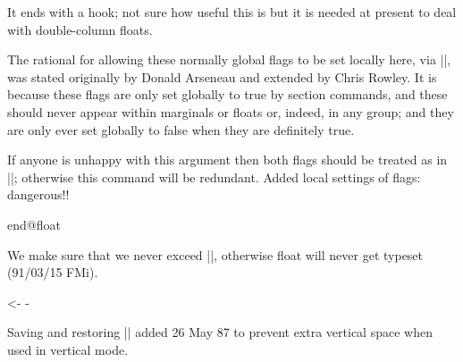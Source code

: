     It ends with a hook; not sure how useful this is but it is needed
    at present to deal with double-column floats.
    
   
    \begin{teX}
  \global \setbox\@currbox
    \color@vbox
      \normalcolor
      \vbox \bgroup
        \hsize\columnwidth
        \@parboxrestore
        \@floatboxreset
}
    \end{teX}

  
  \begin{macro}{\@floatboxreset}
    
 The rational for allowing these normally global flags to be set
 locally here, via |\@parboxrestore|, was stated originally by
 Donald Arseneau and extended by Chris Rowley.
 It is because these flags are only set globally to
 true by section commands, and these should never appear within
 marginals or floats or, indeed, in any group; and they are only ever
 set globally to false when they are definitely true.

 If anyone is unhappy with this argument then both flags should be
 treated as in |\set@nobreak|; otherwise this command will be
 redundant. 
     {Added local settings of flags: dangerous!!}
 \end{macro}
 
      
    \begin{teX}
\def \@floatboxreset {%
        \reset@font
        \normalsize
        \@setminipage
}
    \end{teX}
 
  
\begin{macro}{\@setnobreak}

    \begin{teX}
\def \@setnobreak{%
  \if@nobreak
    \let\outer@nobreak\@nobreaktrue
    \@nobreakfalse
  \fi
}
    \end{teX}
  \end{macro}

  \begin{macro}{\@setminipage}
    \begin{teX}
\def \@setminipage{%
  \@minipagetrue
  \everypar{\@minipagefalse\everypar{}}%
}
    \end{teX}
  \end{macro}



\begin{docCommand}{end@float}{}
\end{docCommand}

    \begin{teX}
\def\end@float{%
  \@endfloatbox
  \ifnum\@floatpenalty <\z@
    \end{teX}
 We make sure that we never exceed |\textheight|, otherwise float
 will never get typeset (91/03/15 FMi).
    \begin{teX}
    \@largefloatcheck
    \@cons\@currlist\@currbox
    \ifnum\@floatpenalty <-\@Mii
      \penalty -\@Miv
    \end{teX}
 Saving and restoring |\prevdepth| added 26 May 87 to prevent extra
 vertical space when used in vertical mode.
    \begin{teX}
      \@tempdima\prevdepth
      \vbox{}%
      \prevdepth\@tempdima
    \end{teX}

